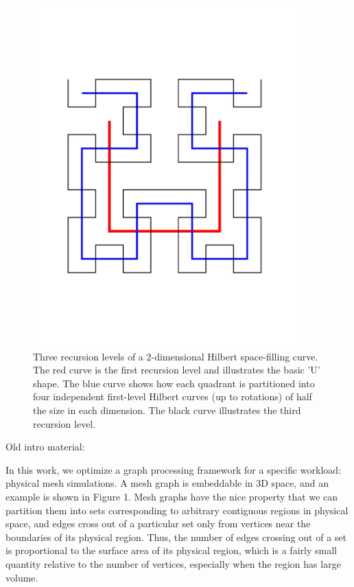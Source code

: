 \begin{figure}[h]
\centering
\includegraphics[width=4in,clip,trim=0 4cm 0 0]{2d_hilbert.pdf}
\caption{Three recursion levels of a 2-dimensional Hilbert space-filling
curve.  The red curve is the first recursion level and illustrates 
the basic 'U' shape.  The blue curve shows how each quadrant is
partitioned into four independent first-level Hilbert curves (up to 
rotations) of half the size in each dimension.  The black curve
illustrates the third recursion level.}
\label{fig:2d_hilbert}
\end{figure}





Old intro material:

In this work, we optimize a graph processing framework for a 
specific workload: physical mesh simulations. A mesh graph 
is embeddable in 3D space, and an example is shown in Figure 
1. Mesh graphs have the nice property that we can partition 
them into sets corresponding to arbitrary contiguous regions 
in physical space, and edges cross out of a particular set 
only from vertices near the boundaries of its physical region. 
Thus, the number of edges crossing out of a set is proportional 
to the surface area of its physical region, which is a fairly 
small quantity relative to the number of vertices, especially 
when the region has large volume.

